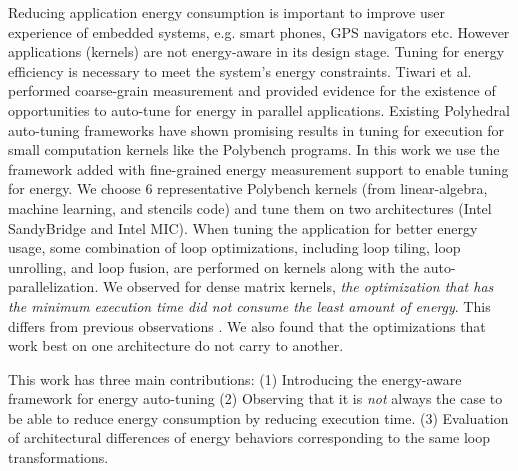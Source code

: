 Reducing application energy consumption is important to improve user experience of 
embedded systems, e.g. smart phones, GPS navigators etc.  
However applications (kernels) are not energy-aware in its design stage. Tuning
for energy efficiency is necessary to meet the system's energy constraints.
Tiwari et al. performed coarse-grain measurement and provided evidence for the 
existence of opportunities to auto-tune for energy in parallel applications\cite{Tiwari:EnergyAutoTune}.
Existing Polyhedral auto-tuning frameworks have shown promising results in tuning for execution
for small computation kernels like the Polybench programs\cite{EJ2012}. 
In this work we use the framework added with fine-grained energy measurement support to enable tuning for energy.
We choose 6 representative Polybench kernels (from linear-algebra, machine learning, and stencils code) 
and tune them on two architectures (Intel SandyBridge and Intel MIC).
When tuning the application for better energy usage, some combination of loop optimizations, including loop 
tiling, loop unrolling, and loop fusion, are performed on kernels along with the auto-parallelization.
We observed for dense matrix kernels, \emph{the optimization that has the minimum execution time 
did not consume the least amount of energy}. This differs from previous observations \cite{Wang2014}.
We also found that the optimizations that work best on one architecture do not carry to another.  
 
This work has three main contributions: 
(1) Introducing the energy-aware framework for energy auto-tuning
(2) Observing that it is \emph{not} always the case to be able to reduce energy consumption by reducing execution time.
(3) Evaluation of architectural differences of energy behaviors corresponding to the same loop transformations.

%
